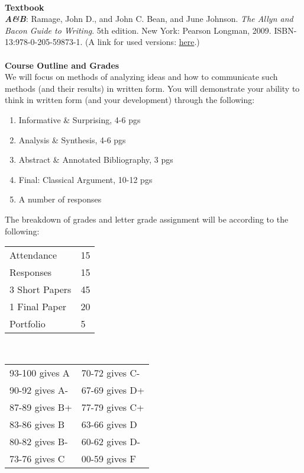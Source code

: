 \documentclass [11pt]{article}
\begin{document}
   \ \\

   {\bf Textbook}\\
{\bf {\sl A\&B}}: Ramage, John D., and John C. Bean, and June Johnson. {\sl The Allyn and Bacon Guide to Writing}. 5th edition. New York: Pearson Longman, 2009. ISBN-13:978-0-205-59873-1. (A link for used versions:  \href{http://www.amazon.com/Allyn-Bacon-Guide-Writing-MyCompLab/dp/0205598730/ref=sr_1_3/175-1452668-8158623?ie=UTF8&s=books&qid=1245772101&sr=1-3}{here}.) \\
   \ \\

   
   {\bf Course Outline and Grades}\\
   We will focus on methods of analyzing ideas and how to communicate such methods (and their results) in written form. You will demonstrate your ability to think in written form (and your development) through the following:
   \begin{enumerate}
     \item Informative \& Surprising, 4-6 pgs
     \item Analysis \& Synthesis, 4-6 pgs
     \item Abstract \& Annotated Bibliography, 3 pgs
     \item Final: Classical Argument, 10-12 pgs
     \item A number of responses
   \end{enumerate}

The breakdown of grades and letter grade assignment will be according to the following:
\vskip 2mm
  
\begin{tabular}{|l|l|}
\hline
Attendance & 15\\
Responses & 15\\
3 Short Papers & 45\\
1 Final Paper & 20\\
Portfolio & 5\\
\hline
\end{tabular} \  \  \  \  \ \begin{tabular}{|l|l|}
   \hline
   93-100 gives A & 70-72 gives C-\\
   90-92 gives A- & 67-69 gives D+\\
   87-89 gives B+ & 77-79 gives C+\\
   83-86 gives B & 63-66 gives D\\
   80-82 gives B- & 60-62 gives D-\\
   73-76 gives C & 00-59 gives F\\
   \hline 
   \end{tabular}
   \ \\
\end{document}
